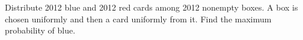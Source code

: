 Distribute 2012 blue and 2012 red cards among 2012 nonempty boxes. A box is chosen uniformly and then a card uniformly from it. Find the maximum probability of blue.

